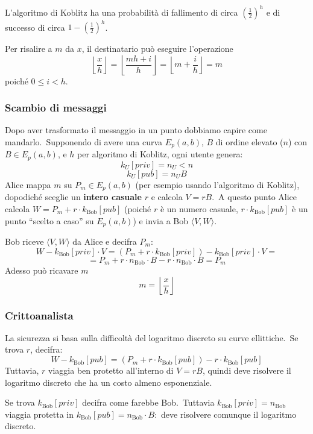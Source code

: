 \noindent L'algoritmo di Koblitz ha una probabilità di fallimento di circa $\left(\frac{1}{2}\right)^h$ e di successo di circa $1 - \left(\frac{1}{2}\right)^h$.\

Per risalire a $m$ da $x$, il destinatario può eseguire l'operazione
\[\left\lfloor \frac{x}{h}\right\rfloor = \left\lfloor \frac{mh + i}{h}\right\rfloor = \left\lfloor m +\frac{i}{h}\right\rfloor= m\]
poiché $0 \leq i < h$.

\subsubsection{Scambio di messaggi}

Dopo aver trasformato il messaggio in un punto dobbiamo capire come mandarlo.\
Supponendo di avere una curva $E_p(a, b)$, $B$ di ordine elevato ($n$) con $B \in E_p(a, b)$, e $h$ per algoritmo di Koblitz, ogni utente genera:
\[k_{U}[\mathit{priv}] = n_U < n\]
\[k_{U}[\mathit{pub}] = n_U B\]
Alice mappa $m$ su $P_m \in E_p(a,b)$ (per esempio usando l'algoritmo di Koblitz), dopodiché sceglie un \textbf{intero casuale} $r$ e calcola $V = rB$.\
A questo punto Alice calcola $W = P_m + r \cdot k_{\mathrm{Bob}}[\mathit{pub}]$ (poiché $r$ è un numero casuale, $r \cdot k_{\mathrm{Bob}}[\mathit{pub}]$ è un punto ``scelto a caso'' su $E_p(a,b)$) e invia a Bob $\langle V, W\rangle$.\

Bob riceve $\langle V, W\rangle$ da Alice e decifra $P_m$:
\[W - k_{\mathrm{Bob}}[\mathit{priv}]\cdot V = (P_m + r\cdot k_{\mathrm{Bob}}[\mathit{priv}]) - k_{\mathrm{Bob}}[\mathit{priv}]\cdot V = \]
\[ = P_m + r\cdot n_{\mathrm{Bob}}\cdot B - r\cdot n_{\mathrm{Bob}}\cdot B = P_m \]
Adesso può ricavare $m$
\[m = \left\lfloor \frac{x}{h}\right\rfloor\]

\subsubsection{Crittoanalista}

La sicurezza si basa sulla difficoltà del logaritmo discreto su curve ellittiche.\
Se trova $r$, decifra:
\[W - k_{\mathrm{Bob}}[\mathit{pub}] = (P_m + r\cdot k_{\mathrm{Bob}}[\mathit{pub}]) - r\cdot k_{\mathrm{Bob}}[\mathit{pub}] \]
Tuttavia, $r$ viaggia ben protetto all'interno di $V = rB$, quindi deve risolvere il logaritmo discreto che ha un costo almeno esponenziale.\

Se trova $k_{\mathrm{Bob}}[\mathit{priv}]$ decifra come farebbe Bob.\
Tuttavia $k_{\mathrm{Bob}}[\mathit{priv}] = n_{\mathrm{Bob}}$ viaggia protetta in $k_{\mathrm{Bob}}[\mathit{pub}] = n_{\mathrm{Bob}} \cdot B$:\ deve risolvere comunque il logaritmo discreto.\

